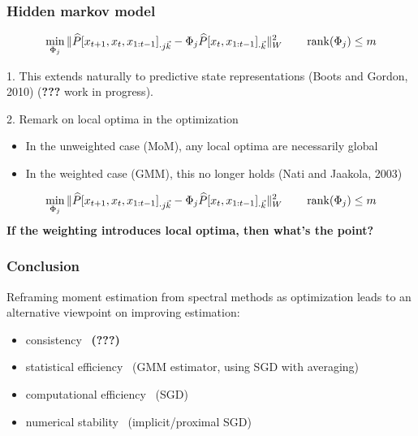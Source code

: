 \documentclass[10pt, compress]{beamer}
\newcommand{\cmark}{\ding{51}}%
\begin{document}
\begin{frame}
  \frametitle{Hidden markov model}
  \begin{equation*}
  \operatornamewithlimits{min}_{\Phi_{j}}
  \|\widehat P[x_{t+1}, x_t, x_{1:t-1}]_{\cdot j\vec{k}} - \Phi_j \widehat P[x_t, x_{1:t-1}]_{\cdot \vec{k}}\|_W^2
  \qquad \operatorname{rank}(\Phi_j)\le m
  \end{equation*}


  1. This extends naturally to predictive state representations (\alert{Boots and Gordon, 2010}) (\textbf{???} work in progress).

  2. Remark on local optima in the optimization
  \begin{itemize}
  \item In the unweighted case (MoM), any local optima are necessarily global
  \item In the weighted case (GMM), this no longer holds (\alert{Nati and Jaakola, 2003})
  \end{itemize}

\end{frame}

\begin{frame}
  \begin{equation*}
  \operatornamewithlimits{min}_{\Phi_{j}}
  \|\widehat P[x_{t+1}, x_t, x_{1:t-1}]_{\cdot j\vec{k}} - \Phi_j \widehat P[x_t, x_{1:t-1}]_{\cdot \vec{k}}\|_W^2
  \qquad \operatorname{rank}(\Phi_j)\le m
  \end{equation*}
  \textbf{If the weighting introduces local optima, then what's the point?}
\end{frame}

\begin{frame}
  \frametitle{Conclusion}

  Reframing moment estimation from spectral methods as \alert{optimization} leads to an alternative viewpoint on improving estimation:
  \begin{itemize}
  \item consistency \cmark~\textbf{(???)}
  \item statistical efficiency \cmark~(GMM estimator, using SGD with averaging)
  \item computational efficiency \cmark~(SGD)
  \item numerical stability \cmark~(implicit/proximal SGD)
  \end{itemize}

\end{frame}

\end{document}

